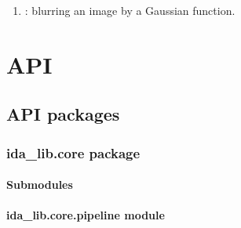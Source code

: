 \documentclass[letterpaper,10pt,english]{sphinxmanual}
\begin{document}
\begin{enumerate}
%
\setcounter{enumi}{16}
\item {} 
: blurring an image by a Gaussian function.

\end{enumerate}



\section{API}
\label{\detokenize{ida_lib:api}}\label{\detokenize{ida_lib::doc}}

\subsection{API packages}
\label{\detokenize{ida_lib:api-packages}}

\subsubsection{ida\_lib.core package}
\label{\detokenize{ida_lib.core:ida-lib-core-package}}\label{\detokenize{ida_lib.core::doc}}

\paragraph{Submodules}
\label{\detokenize{ida_lib.core:submodules}}

\paragraph{ida\_lib.core.pipeline module}
\label{\detokenize{ida_lib.core:module-ida_lib.core.pipeline}}\label{\detokenize{ida_lib.core:ida-lib-core-pipeline-module}}
\end{document}
